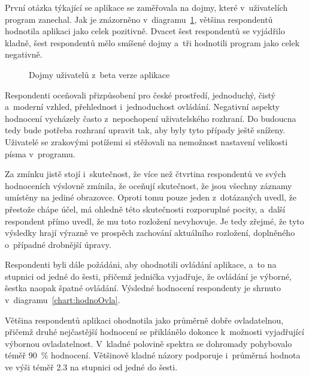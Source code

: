 	První otázka týkající se aplikace se zaměřovala na dojmy, které v~uživatelích program zanechal. Jak je znázorněno v~diagramu~\ref{chart:hodnoDojmy}, většina respondentů hodnotila aplikaci jako celek pozitivně. Dvacet šest respondentů se vyjádřilo kladně, šest respondentů mělo smíšené dojmy a~tři hodnotili program jako celek negativně.\par
	\begin{figure}[bh!]
		\caption{Dojmy uživatelů z~beta verze aplikace}
		\label{chart:hodnoDojmy}
	\end{figure}
	Respondenti oceňovali přizpůsobení pro české prostředí, jednoduchý, čistý a~moderní vzhled, přehlednost i~jednoduchost ovládání. Negativní aspekty hodnocení vycházely často z~nepochopení uživatelského rozhraní. Do budoucna tedy bude potřeba rozhraní upravit tak, aby byly tyto případy ještě sníženy. Uživatelé se zrakovými potížemi si stěžovali na nemožnost nastavení velikosti písma v~programu. \par
	Za zmínku jistě stojí i~skutečnost, že více než čtvrtina respondentů ve svých hodnoceních výslovně zmínila, že oceňují skutečnost, že jsou všechny záznamy umístěny na jediné obrazovce. Oproti tomu pouze jeden z~dotázaných uvedl, že přestože chápe účel, má ohledně této skutečnosti rozporuplné pocity, a~další respondent přímo uvedl, že mu toto rozložení nevyhovuje. Je tedy zřejmé, že tyto výsledky hrají výrazně ve prospěch zachování aktuálního rozložení, doplněného o~případné drobnější úpravy.\par
	
	Respondenti byli dále požádáni, aby ohodnotili ovládání aplikace, a~to na stupnici od jedné do šesti, přičemž jednička vyjadřuje, že ovládání je výborné, šestka naopak špatné ovládání. Výsledné hodnocení respondenty je shrnuto v~diagramu~\ref{chart:hodnoOvla}.\par
	Většina respondentů aplikaci ohodnotila jako průměrně dobře ovladatelnou, přičemž druhé nejčastější hodnocení se přiklánělo dokonce k~možnosti vyjadřující výbornou ovladatelnost. V~kladné polovině spektra se dohromady pohybovalo téměř 90~\% hodnocení. Většinově kladné názory podporuje i~průměrná hodnota ve výši téměř 2.3 na stupnici od jedné do šesti. \par
	
	\hodnoSest
	
